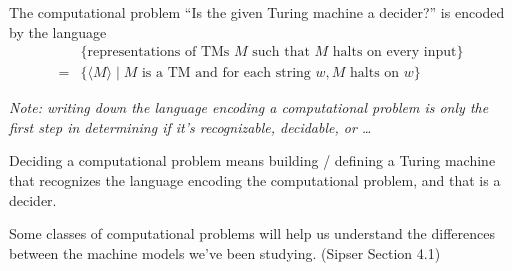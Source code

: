 \documentclass[12pt, oneside]{article}
\begin{document}
The computational problem ``Is the given Turing machine a decider?'' is encoded by the language
\begin{align*}
  &\{ \textrm{representations of TMs $M$  such that $M$ halts on every input}\}  \\
  =& \{ \langle M \rangle \mid M \textrm{ is a TM and for each string } w, \textrm{$M$ halts on $w$} \}
\end{align*}


{\it Note: writing down the language encoding a computational problem is only the first step in 
determining if it's recognizable, decidable, or \ldots }

Deciding a computational problem means building / defining a Turing 
machine that recognizes the language encoding the computational problem, and that 
is a decider.


Some classes of computational problems will 
help us understand the differences between the machine models we've been studying. (Sipser Section 4.1)
\end{document}
